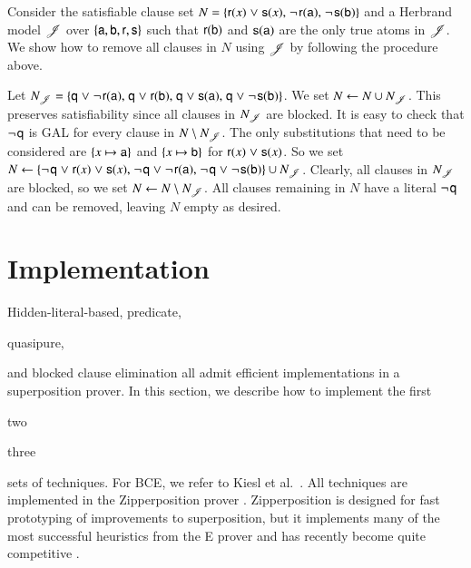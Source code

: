 \begin{exa}
   Consider the satisfiable clause set $N = \{{\mathsf{r}(x)} \mathrel{\lor}
   {\mathsf{s}(x)}{,}\; \neg{\kern.2ex \mathsf{r}(\mathsf{a})}{,}\allowbreak\;
   \neg{\kern.2ex \mathsf{s}(\mathsf{b})}\}$ and a Herbrand model $\mathscr{J}$ over
   $\{\mathsf{a}, \mathsf{b}, \mathsf{r}, \mathsf{s}\}$ such that
   $\mathsf{r}(\mathsf{b})$ and $\mathsf{s}(\mathsf{a})$ are the only true atoms in
   $\mathscr{J}$. We show how to remove all clauses in $N$ using $\mathscr{J}$ 
   by following the procedure above.

   Let $N_{\mathscr{J}} = \{ \mathsf{q} \mathrel{\lor} \neg{\kern.2ex \mathsf{r}(\mathsf{a})}{,}\; \mathsf{q}
   \mathrel{\lor} {\mathsf{r}(\mathsf{b})}{,}\; \mathsf{q} \mathrel{\lor}
   {\mathsf{s}(\mathsf{a})}{,}\; \mathsf{q} \mathrel{\lor} \neg{\kern.2ex \mathsf{s}(\mathsf{b})}
   \}$. We set $N \gets N \cup N_{\mathscr{J}}$. This preserves satisfiability
   since all clauses in $N_{\mathscr{J}}$ are blocked. It is easy to check that
   $\neg{\kern.2ex \mathsf{q}}$ is GAL for every clause in $N \setminus N_{\mathscr{J}}$. The
   only substitutions that need to be considered are $\{x \mapsto \mathsf{a} \}$ and $\{x \mapsto
   \mathsf{b} \}$ for ${\mathsf{r}(x)} \mathrel{\lor} {\mathsf{s}(x)}$.
   So we set $N \gets \{\neg{\kern.2ex \mathsf{q}} \mathrel{\lor} {\mathsf{r}(x)} \mathrel{\lor} {\mathsf{s}(x)}{,}\;
   \neg{\kern.2ex \mathsf{q}} \mathrel{\lor} \neg{\kern.2ex \mathsf{r}(\mathsf{a})}{,}\;
   \neg{\kern.2ex \mathsf{q}} \mathrel{\lor} \neg{\kern.2ex \mathsf{s}(\mathsf{b})}\} \cup N_{\mathscr{J}}$.
   Clearly, all clauses in $N_{\mathscr{J}}$ are blocked, so we set $N \gets N \setminus
   N_{\mathscr{J}}$. All clauses remaining in $N$ have a literal $\neg{\kern.2ex \mathsf{q}}$
   and can be removed, leaving $N$ empty as desired.
\end{exa}

\section{Implementation}
\label{sec:satfol:implementation}

\newcommand{\impmap}{\textit{Imp}}

Hidden-literal-based, predicate, \begin{qle}quasipure, \end{qle}and blocked clause
elimination all admit efficient implementations in a superposition
prover. In this section, we describe how to implement the first
\begin{noqle}two\end{noqle}\begin{qle}three\end{qle} sets of
techniques. For BCE, we refer to Kiesl et al.\ \cite{ksstb-2017-blockedfol}.
All techniques are implemented in the Zipperposition prover
\cite{sc-supind-17}. Zipperposition is designed for fast prototyping
of improvements to superposition, but it implements many of the most successful
heuristics from the E prover \cite{scv-19-e23} and has recently become
quite competitive \cite{gs-19-casc27}.

